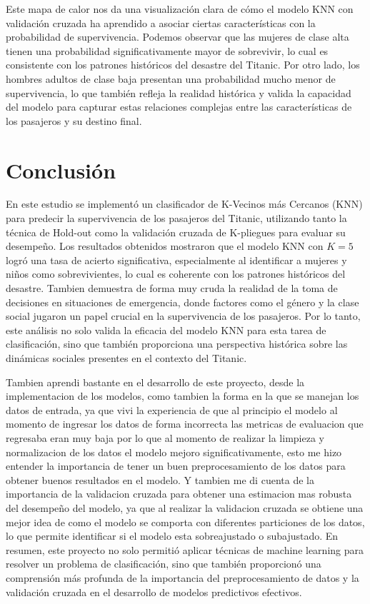 \documentclass[12pt]{article}
\begin{document}
    Este mapa de calor nos da una visualización clara de cómo el modelo KNN con validación cruzada ha aprendido a asociar ciertas características con la probabilidad de supervivencia. Podemos observar que las mujeres de clase alta tienen una probabilidad significativamente mayor de sobrevivir, lo cual es consistente con los patrones históricos del desastre del Titanic. Por otro lado, los hombres adultos de clase baja presentan una probabilidad mucho menor de supervivencia, lo que también refleja la realidad histórica y valida la capacidad del modelo para capturar estas relaciones complejas entre las características de los pasajeros y su destino final.

\section{Conclusión}
En este estudio se implementó un clasificador de K-Vecinos más Cercanos (KNN) para predecir la supervivencia de los pasajeros del Titanic, utilizando tanto la técnica de Hold-out como la validación cruzada de K-pliegues para evaluar su desempeño. Los resultados obtenidos mostraron que el modelo KNN con $K=5$ logró una tasa de acierto significativa, especialmente al identificar a mujeres y niños como sobrevivientes, lo cual es coherente con los patrones históricos del desastre.
Tambien demuestra de forma muy cruda la realidad de la toma de decisiones en situaciones de emergencia, donde factores como el género y la clase social jugaron un papel crucial en la supervivencia de los pasajeros. 
Por lo tanto, este análisis no solo valida la eficacia del modelo KNN para esta tarea de clasificación, sino que también proporciona una perspectiva histórica sobre las dinámicas sociales presentes en el contexto del Titanic.

Tambien aprendi bastante en el desarrollo de este proyecto, desde la implementacion de los modelos, como tambien la forma en la que se manejan los datos de entrada, ya que vivi la experiencia de que al principio el modelo al momento de ingresar los datos de forma incorrecta las metricas de evaluacion que regresaba eran muy baja por lo que al momento de realizar la limpieza y normalizacion de los datos el modelo mejoro significativamente, esto me hizo entender la importancia de tener un buen preprocesamiento de los datos para obtener buenos resultados en el modelo.
Y tambien me di cuenta de la importancia de la validacion cruzada para obtener una estimacion mas robusta del desempeño del modelo, ya que al realizar la validacion cruzada se obtiene una mejor idea de como el modelo se comporta con diferentes particiones de los datos, lo que permite identificar si el modelo esta sobreajustado o subajustado.
En resumen, este proyecto no solo permitió aplicar técnicas de machine learning para resolver un problema de clasificación, sino que también proporcionó una comprensión más profunda de la importancia del preprocesamiento de datos y la validación cruzada en el desarrollo de modelos predictivos efectivos.

\printbibliography[title={ Bibliográficas}]
\end{document}
